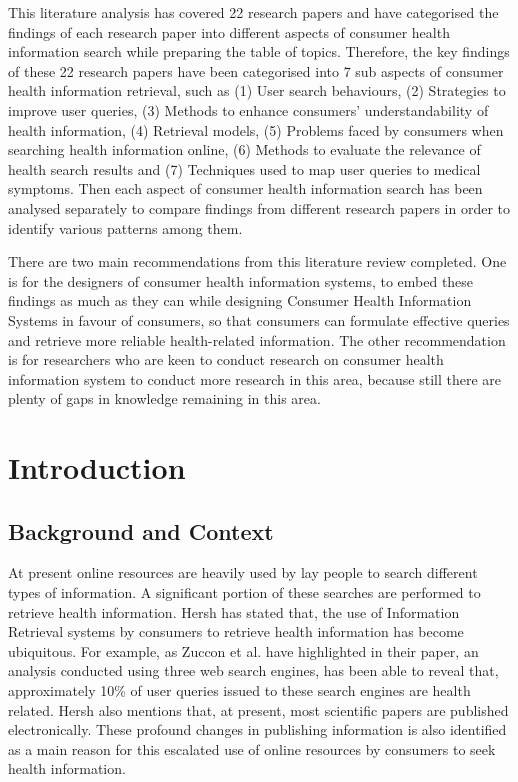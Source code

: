 \documentclass[]{article}
\begin{document}
This literature analysis has covered 22 research papers and have categorised the findings of each research paper into different aspects of consumer health information search while preparing the table of topics. Therefore, the key findings of these 22 research papers have been categorised into 7 sub aspects of consumer health information retrieval, such as (1) User search behaviours, (2) Strategies to improve user queries, (3) Methods to enhance consumers' understandability of health information, (4) Retrieval models, (5) Problems faced by consumers when searching health information online, (6) Methods to evaluate the relevance of health search results and (7) Techniques used to map user queries to medical symptoms. Then each aspect of consumer health information search has been analysed separately to compare findings from different research papers in order to identify various patterns among them.  

There are two main recommendations from this literature review completed. One is for the designers of consumer health information systems, to embed these findings as much as they can while designing Consumer Health Information Systems in favour of consumers, so that consumers can formulate effective queries and retrieve more reliable health-related information. The other recommendation is for researchers who are keen to conduct research on consumer health information system to conduct more research in this area, because still there are plenty of gaps in knowledge remaining in this area.

\pagebreak

\tableofcontents

\pagebreak	

\section{Introduction}    
	
\subsection{Background and Context}
	
At present online resources are heavily used by lay people to search different types of information. A significant portion of these searches are performed to retrieve health information. Hersh \cite{hersh2015information} has stated that, the use of Information Retrieval systems by consumers to retrieve health information has become ubiquitous. For example, as Zuccon et al. \cite{zuccon2015diagnose} have highlighted in their paper, an analysis conducted using three web search engines, has been able to reveal that, approximately 10\% of user queries issued to these search engines are health related.  Hersh \cite{hersh2015information} also mentions that, at present, most scientific papers are published electronically. These profound changes in publishing information is also identified as a main reason for this escalated use of online resources by consumers to seek health information.
	
\end{document}
